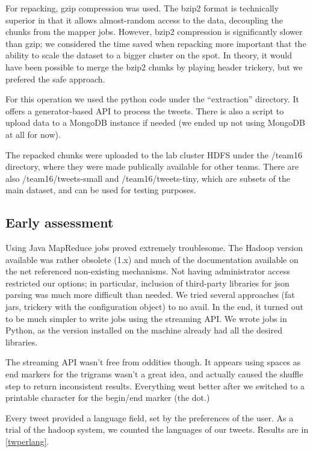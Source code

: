 \documentclass[a4paper,11pt]{article}
\begin{document}
For repacking, gzip compression was used. The bzip2 format is technically superior in that it allows almost-random access to the data, decoupling the chunks from the mapper jobs. However, bzip2 compression is significantly slower than gzip; we considered the time saved when repacking more important that the ability to scale the dataset to a bigger cluster on the spot. In theory, it would have been possible to merge the bzip2 chunks by playing header trickery, but we prefered the safe approach.

For this operation we used the python code under the ``extraction'' directory. It offers a generator-based API to process the tweets. There is also a script to upload data to a MongoDB instance if needed (we ended up not using MongoDB at all for now).

The repacked chunks were uploaded to the lab cluster HDFS under the /team16 directory, where they were made publically available for other teams. There are also /team16/tweets-small and /team16/tweets-tiny, which are subsets of the main dataset, and can be used for testing purposes.

\subsection{Early assessment}

Using Java MapReduce jobs proved extremely troublesome. The Hadoop version available was rather obsolete (1.x) and much of the documentation available on the net referenced non-existing mechanisms. Not having administrator access restricted our options; in particular, inclusion of third-party libraries for json parsing was much more difficult than needed. We tried several approaches (fat jars, trickery with the configuration object) to no avail. In the end, it turned out to be much simpler to write jobs using the streaming API. We wrote jobs in Python, as the version installed on the machine already had all the desired libraries.


The streaming API wasn't free from oddities though. It appears using spaces as end markers for the trigrams wasn't a great idea, and
actually caused the shuffle step to return inconsistent results. Everything went better after we switched to a printable character
for the begin/end marker (the dot.)

Every tweet provided a language field, set by the preferences of the user. As a trial of the hadoop system, we counted the languages of our tweets. Results are in \ref{twperlang}.
\end{document}
